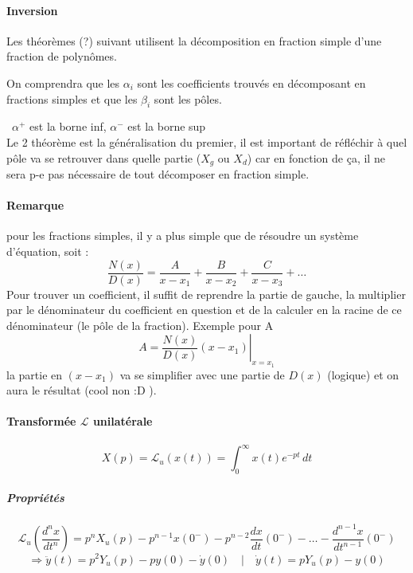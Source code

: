 \paragraph{Inversion}
Les théorèmes (?) suivant utilisent la décomposition en fraction simple d'une fraction de polynômes.
\begin{center}
      \end{center}
On comprendra que les $\alpha_i$ sont les coefficients trouvés en décomposant en fractions simples et que les $\beta_i$ sont les pôles.
\begin{center}
      \end{center}
\danger\ $\alpha^+$ est la borne inf, $\alpha^-$ est la borne sup\\
Le 2 théorème est la généralisation du premier, il est important de réfléchir à quel pôle va se retrouver dans quelle partie ($X_g$ ou $X_d$) car en fonction de ça, il ne sera p-e pas nécessaire de tout décomposer en fraction simple.
\paragraph{Remarque} pour les fractions simples, il y a plus simple que de résoudre un système d'équation, soit : $$\frac{N(x)}{D(x)}=\frac{A}{x-x_1}+\frac{B}{x-x_2}+\frac{C}{x-x_3}+\dots$$ Pour trouver un coefficient, il suffit de reprendre la partie de gauche, la multiplier par le dénominateur du coefficient en question et de la calculer en la racine de ce dénominateur (le pôle de la fraction). Exemple pour A $$A=\left.\frac{N(x)}{D(x)}(x-x_1)\right|_{x=x_1}$$
la partie en $(x-x_1)$ va se simplifier avec une partie de $D(x)$ (logique) et on aura le résultat (cool non :D ).
\paragraph{Transformée $\mathcal{L}$ unilatérale}
$$X(p)=\text{$\mathbf{\mathcal{L}}$}_u(x(t))=\int_{0}^{\infty}x(t)e^{-pt}\,dt$$
\subparagraph{Propriétés}
$$\mathcal{L}_u\left(\frac{d^nx}{dt^n}\right)=p^nX_u(p)-p^{n-1}x(0^-)-p^{n-2}\frac{dx}{dt}(0^-)-\dots-\frac{d^{n-1}x}{dt^{n-1}}(0^-)$$
$$\Rightarrow \ddot{y}(t)=p^2Y_u(p)-py(0)-\dot y(0)\quad|\quad\dot y(t)=pY_u(p)-y(0)$$